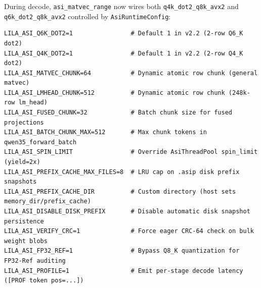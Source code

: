 \documentclass[11pt,a4paper]{article}
\begin{document}
During decode, \texttt{asi\_matvec\_range} now wires both \texttt{q4k\_dot2\_q8k\_avx2} and \texttt{q6k\_dot2\_q8k\_avx2} controlled by \texttt{AsiRuntimeConfig}:

\begin{lstlisting}[caption={ASI v2.2 runtime tuning, prefix cache, and audit environment variables.}]
LILA_ASI_Q6K_DOT2=1                # Default 1 in v2.2 (2-row Q6_K dot2)
LILA_ASI_Q4K_DOT2=1                # Default 1 in v2.2 (2-row Q4_K dot2)
LILA_ASI_MATVEC_CHUNK=64           # Dynamic atomic row chunk (general matvec)
LILA_ASI_LMHEAD_CHUNK=512          # Dynamic atomic row chunk (248k-row lm_head)
LILA_ASI_FUSED_CHUNK=32            # Batch chunk size for fused projections
LILA_ASI_BATCH_CHUNK_MAX=512       # Max chunk tokens in qwen35_forward_batch
LILA_ASI_SPIN_LIMIT                # Override AsiThreadPool spin_limit (yield=2x)
LILA_ASI_PREFIX_CACHE_MAX_FILES=8  # LRU cap on .asip disk prefix snapshots
LILA_ASI_PREFIX_CACHE_DIR          # Custom directory (host sets memory_dir/prefix_cache)
LILA_ASI_DISABLE_DISK_PREFIX       # Disable automatic disk snapshot persistence
LILA_ASI_VERIFY_CRC=1              # Force eager CRC-64 check on bulk weight blobs
LILA_ASI_FP32_REF=1                # Bypass Q8_K quantization for FP32-Ref auditing
LILA_ASI_PROFILE=1                 # Emit per-stage decode latency ([PROF token pos=...])
\end{lstlisting}
\end{document}
